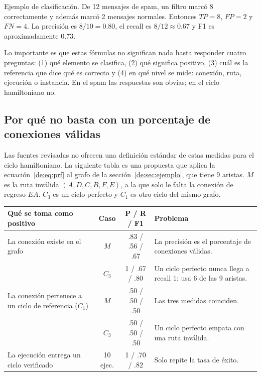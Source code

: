 Ejemplo de clasificación. De 12 mensajes de spam, un filtro marcó 8 correctamente y además marcó 2 mensajes normales. Entonces $TP=8$, $FP=2$ y $FN=4$. La precisión es $8/10=0.80$, el recall es $8/12\approx 0.67$ y F1 es aproximadamente $0.73$.

Lo importante es que estas fórmulas no significan nada hasta responder cuatro preguntas: (1) qué elemento se clasifica, (2) qué significa positivo, (3) cuál es la referencia que dice qué es correcto y (4) en qué nivel se mide: conexión, ruta, ejecución o instancia. En el spam las respuestas son obvias; en el ciclo hamiltoniano no.

\subsection{Por qué no basta con un porcentaje de conexiones válidas}
Las fuentes revisadas no ofrecen una definición estándar de estas medidas para el ciclo hamiltoniano. La siguiente tabla es una propuesta que aplica la ecuación~\eqref{de:eq:prf} al grafo de la sección~\ref{de:sec:ejemplo}, que tiene 9 aristas. $M$ es la ruta inválida $(A,D,C,B,F,E)$, a la que solo le falta la conexión de regreso $EA$. $C_3$ es un ciclo perfecto y $C_1$ es otro ciclo del mismo grafo.

\begin{center}

\begin{adjustbox}{max width=\linewidth}
\begin{tabular}{@{}P{4.9cm}ccP{6.5cm}@{}}
\toprule
Qué se toma como positivo & Caso & P / R / F1 & Problema\\
\midrule
La conexión existe en el grafo & $M$ & .83 / .56 / .67 & La precisión es el porcentaje de conexiones válidas.\\
 & $C_3$ & 1 / .67 / .80 & Un ciclo perfecto nunca llega a recall 1: usa 6 de las 9 aristas.\\
\addlinespace
La conexión pertenece a un ciclo de referencia ($C_1$) & $M$ & .50 / .50 / .50 & Las tres medidas coinciden.\\
 & $C_3$ & .50 / .50 / .50 & Un ciclo perfecto empata con una ruta inválida.\\
\addlinespace
La ejecución entrega un ciclo verificado & 10 ejec. & 1 / .70 / .82 & Solo repite la tasa de éxito.\\
\bottomrule
\end{tabular}
\end{adjustbox}
\end{center}

